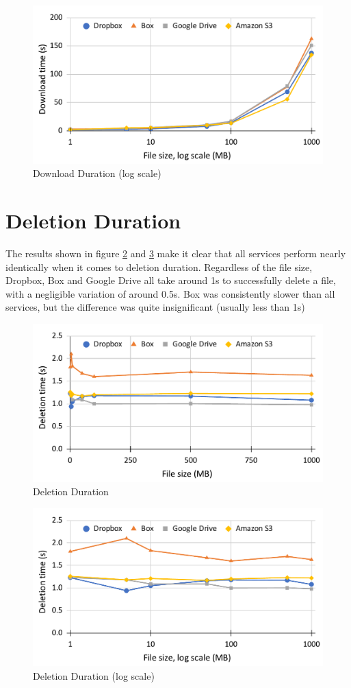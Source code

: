 \begin{figure} [!h]
    \centering
    \includegraphics[scale=0.6]{images/download_log_chart}
    \caption{\label{fig:download_log_duration}Download Duration (log scale)}
\end{figure}

\section{Deletion Duration}
The results shown in figure \ref{fig:deletion_duration} and \ref{fig:deletion_log_duration} make it clear that all services perform nearly identically when it comes to deletion duration. Regardless of the file size, Dropbox, Box and Google Drive all take around 1s to successfully delete a file, with a negligible variation of around 0.5s. Box was consistently slower than all services, but the difference was quite insignificant (usually less than 1s)

\begin{figure} [!h]
    \centering
    \includegraphics[scale=0.5]{images/deletion_chart}
    \caption{\label{fig:deletion_duration}Deletion Duration}
\end{figure}

\begin{figure} [!h]
    \centering
    \includegraphics[scale=0.5]{images/deletion_log_chart}
    \caption{\label{fig:deletion_log_duration}Deletion Duration (log scale)}
\end{figure}